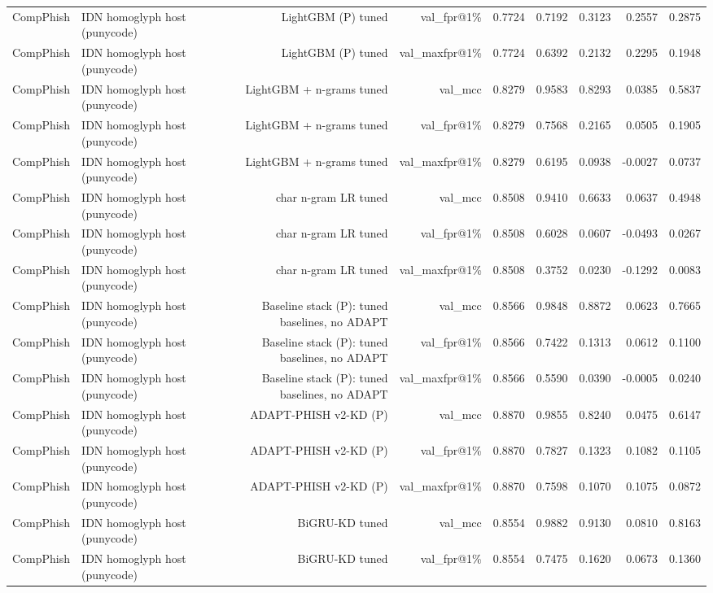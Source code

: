 \begin{table}[t]
\begin{tabular}{llrrrrrrr}
CompPhish & IDN homoglyph host (punycode) & LightGBM (P) tuned & val\_fpr@1\% & 0.7724 & 0.7192 & 0.3123 & 0.2557 & 0.2875 \\
CompPhish & IDN homoglyph host (punycode) & LightGBM (P) tuned & val\_maxfpr@1\% & 0.7724 & 0.6392 & 0.2132 & 0.2295 & 0.1948 \\
CompPhish & IDN homoglyph host (punycode) & LightGBM + n-grams tuned & val\_mcc & 0.8279 & 0.9583 & 0.8293 & 0.0385 & 0.5837 \\
CompPhish & IDN homoglyph host (punycode) & LightGBM + n-grams tuned & val\_fpr@1\% & 0.8279 & 0.7568 & 0.2165 & 0.0505 & 0.1905 \\
CompPhish & IDN homoglyph host (punycode) & LightGBM + n-grams tuned & val\_maxfpr@1\% & 0.8279 & 0.6195 & 0.0938 & -0.0027 & 0.0737 \\
CompPhish & IDN homoglyph host (punycode) & char n-gram LR tuned & val\_mcc & 0.8508 & 0.9410 & 0.6633 & 0.0637 & 0.4948 \\
CompPhish & IDN homoglyph host (punycode) & char n-gram LR tuned & val\_fpr@1\% & 0.8508 & 0.6028 & 0.0607 & -0.0493 & 0.0267 \\
CompPhish & IDN homoglyph host (punycode) & char n-gram LR tuned & val\_maxfpr@1\% & 0.8508 & 0.3752 & 0.0230 & -0.1292 & 0.0083 \\
CompPhish & IDN homoglyph host (punycode) & Baseline stack (P): tuned baselines, no ADAPT & val\_mcc & 0.8566 & 0.9848 & 0.8872 & 0.0623 & 0.7665 \\
CompPhish & IDN homoglyph host (punycode) & Baseline stack (P): tuned baselines, no ADAPT & val\_fpr@1\% & 0.8566 & 0.7422 & 0.1313 & 0.0612 & 0.1100 \\
CompPhish & IDN homoglyph host (punycode) & Baseline stack (P): tuned baselines, no ADAPT & val\_maxfpr@1\% & 0.8566 & 0.5590 & 0.0390 & -0.0005 & 0.0240 \\
CompPhish & IDN homoglyph host (punycode) & ADAPT-PHISH v2-KD (P) & val\_mcc & 0.8870 & 0.9855 & 0.8240 & 0.0475 & 0.6147 \\
CompPhish & IDN homoglyph host (punycode) & ADAPT-PHISH v2-KD (P) & val\_fpr@1\% & 0.8870 & 0.7827 & 0.1323 & 0.1082 & 0.1105 \\
CompPhish & IDN homoglyph host (punycode) & ADAPT-PHISH v2-KD (P) & val\_maxfpr@1\% & 0.8870 & 0.7598 & 0.1070 & 0.1075 & 0.0872 \\
CompPhish & IDN homoglyph host (punycode) & BiGRU-KD tuned & val\_mcc & 0.8554 & 0.9882 & 0.9130 & 0.0810 & 0.8163 \\
CompPhish & IDN homoglyph host (punycode) & BiGRU-KD tuned & val\_fpr@1\% & 0.8554 & 0.7475 & 0.1620 & 0.0673 & 0.1360 \\

\end{tabular}
\end{table}
